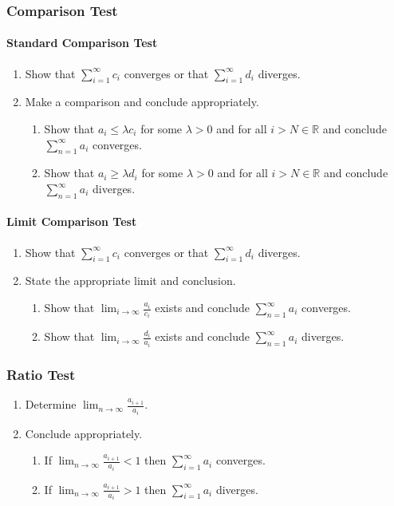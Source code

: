 \documentclass[10pt,twoside,twocolumn]{article}
\newcommand{\R}[0]{\mathds{R}} %
\begin{document}
\subsubsection{Comparison Test}


\paragraph{Standard Comparison Test}
\begin{enumerate}
\item Show that $\sum_{i=1}^{\infty}c_{i}$ converges or that $\sum_{i=1}^{\infty}d_{i}$
diverges. 
\item Make a comparison and conclude appropriately.

\begin{enumerate}
\item Show that $a_{i}\leq\lambda c_{i}$ for some $\lambda>0$ and for
all $i>N\in\R$ and conclude $\sum_{n=1}^{\infty}a_{i}$ converges. 
\item Show that $a_{i}\geq\lambda d_{i}$ for some $\lambda>0$ and for
all $i>N\in\R$ and conclude $\sum_{n=1}^{\infty}a_{i}$ diverges. 
\end{enumerate}
\end{enumerate}

\paragraph{Limit Comparison Test}
\begin{enumerate}
\item Show that $\sum_{i=1}^{\infty}c_{i}$ converges or that $\sum_{i=1}^{\infty}d_{i}$
diverges. 
\item State the appropriate limit and conclusion.

\begin{enumerate}
\item Show that $\lim_{i\rightarrow\infty}\frac{a_{i}}{c_{i}}$ exists and
conclude $\sum_{n=1}^{\infty}a_{i}$ converges. 
\item Show that $\lim_{i\rightarrow\infty}\frac{d_{i}}{a_{i}}$ exists and
conclude $\sum_{n=1}^{\infty}a_{i}$ diverges. 
\end{enumerate}
\end{enumerate}

\subsubsection{Ratio Test}
\begin{enumerate}
\item Determine $\lim_{n\rightarrow\infty}\frac{a_{i+1}}{a_{i}}$. 
\item Conclude appropriately.

\begin{enumerate}
\item If $\lim_{n\rightarrow\infty}\frac{a_{i+1}}{a_{i}}<1$ then $\sum_{i=1}^{\infty}a_{i}$
converges. 
\item If $\lim_{n\rightarrow\infty}\frac{a_{i+1}}{a_{i}}>1$ then $\sum_{i=1}^{\infty}a_{i}$
diverges. 
\end{enumerate}
\end{enumerate}
\end{document}
